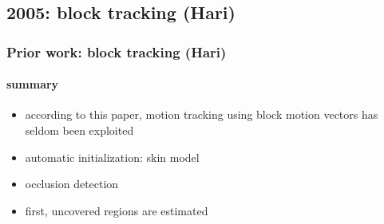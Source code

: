\subsection{2005: block tracking (Hari)}
\begin{frame}
\frametitle{Prior work: block tracking (Hari)}
\framesubtitle{summary}
\mypagenum
{}
	\begin{itemize}
		\item according to this paper, {\color{red}motion tracking using block motion vectors has seldom been exploited}
		\item automatic initialization: skin model
		\item occlusion detection
		\item first, uncovered regions are estimated
	\end{itemize}
\end{frame}